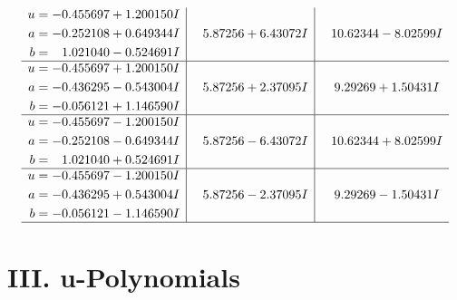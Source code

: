 \documentclass[1p]{elsarticle_modified}
\theoremstyle{definition}
\begin{document}
$$\begin{array}{c|c|c}
\begin{aligned}
u &= -0.455697 + 1.200150 I \\
a &= -0.252108 + 0.649344 I \\
b &= \phantom{-}1.021040 - 0.524691 I\end{aligned}
 & \phantom{-}5.87256 + 6.43072 I & \phantom{-}10.62344 - 8.02599 I \\ \hline\begin{aligned}
u &= -0.455697 + 1.200150 I \\
a &= -0.436295 - 0.543004 I \\
b &= -0.056121 + 1.146590 I\end{aligned}
 & \phantom{-}5.87256 + 2.37095 I & \phantom{-}9.29269 + 1.50431 I \\ \hline\begin{aligned}
u &= -0.455697 - 1.200150 I \\
a &= -0.252108 - 0.649344 I \\
b &= \phantom{-}1.021040 + 0.524691 I\end{aligned}
 & \phantom{-}5.87256 - 6.43072 I & \phantom{-}10.62344 + 8.02599 I \\ \hline\begin{aligned}
u &= -0.455697 - 1.200150 I \\
a &= -0.436295 + 0.543004 I \\
b &= -0.056121 - 1.146590 I\end{aligned}
 & \phantom{-}5.87256 - 2.37095 I & \phantom{-}9.29269 - 1.50431 I\\
 \hline 
 \end{array}$$\newpage
\newpage\renewcommand{\arraystretch}{1}
\centering \section*{ III. u-Polynomials}
\end{document}

